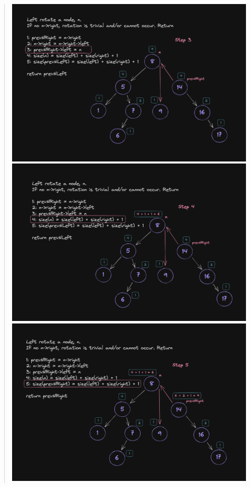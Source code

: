 \documentclass[11pt]{article}
\begin{document}
\begin{enumerate}
\begin{enumerate}
\begin{quote}
           \newline
           \includegraphics[scale=0.3]{left_rotations/lr3.png}         
           \newline
           \includegraphics[scale=0.3]{left_rotations/lr4.png}         
           \newline
           \includegraphics[scale=0.3]{left_rotations/lr5.png}         

\end{quote}
\end{enumerate}
\end{enumerate}
\end{document}
